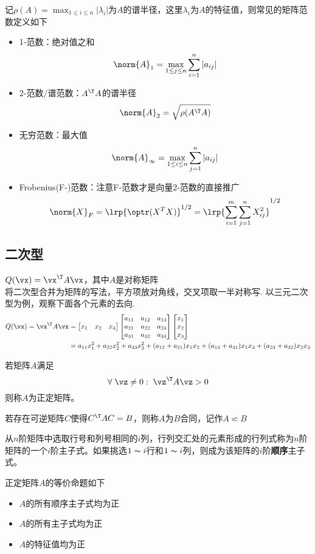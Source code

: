 记$\rho(A)=\max_{1\leq i\leq n}|\lambda_i|$为$A$的谱半径，这里$\lambda_i$为$A$的特征值，则常见的矩阵范数定义如下
\begin{itemize}
    \item 1-范数：绝对值之和
    \[\norm{A}_1=\max_{1\leq j\leq n}\sum_{i=1}^n|a_{ij}|\]
    \item 2-范数/谱范数：$A^\T A$的谱半径
    \[\norm{A}_2=\sqrt{\rho(A^\T A)}\]
    \item 无穷范数：最大值
    \[\norm{A}_\infty=\max_{1\leq i\leq n}\sum_{j=1}^n|a_{ij}|\]
    \item Frobenius(F-)范数：注意F-范数才是向量2-范数的直接推广
    \[\norm{X}_F=\lrp{\optr(X^T X)}^{1/2}=\lrp{\sum_{i=1}^m\sum_{j=1}^n X_{ij}^2}^{1/2}\]
\end{itemize}

\subsection{二次型}
\begin{definition}[二次型]
$Q(\vx)=\vx^\T A\vx$，其中$A$是对称矩阵\\
将二次型合并为矩阵的写法，平方项放对角线，交叉项取一半对称写. 以三元二次型为例，观察下面各个元素的去向.
\[\begin{aligned}Q(\vx)=\vx^\T A\vx&=\begin{bmatrix}x_1&x_2&x_3\end{bmatrix}\begin{bmatrix}a_{11}&a_{12}&a_{13}\\a_{21}&a_{22}&a_{23}\\a_{31}&a_{32}&a_{33}\end{bmatrix}\begin{bmatrix}x_1\\x_2\\x_3\end{bmatrix}\\
&=a_{11}x_1^2+a_{22}x_2^2+a_{33}x_3^2+(a_{12}+a_{21})x_1x_2+(a_{13}+a_{31})x_1x_3+(a_{23}+a_{32})x_2x_3\end{aligned}\]
\end{definition}
\begin{definition}
若矩阵$A$满足
\[\forall\;\vz\ne 0:\;\vz^\T A\vz>0\]
则称$A$为正定矩阵。
\end{definition}
\begin{definition}[合同(congruent)矩阵]
    若存在可逆矩阵$C$使得$C^\T AC=B$，则称$A$为$B$合同，记作$A\backsimeq B$
\end{definition}
\begin{definition}[主子式]
    从$n$阶矩阵中选取行号和列号相同的$i$列，行列交汇处的元素形成的行列式称为$n$阶矩阵的一个$i$阶主子式。如果挑选$1\thicksim i$行和$1\thicksim i$列，则成为该矩阵的$i$阶\textbf{顺序}主子式。
\end{definition}
正定矩阵$A$的等价命题如下
\begin{itemize}
    \item $A$的所有顺序主子式均为正
    \item $A$的所有主子式均为正
    \item $A$的特征值均为正
\end{itemize}

